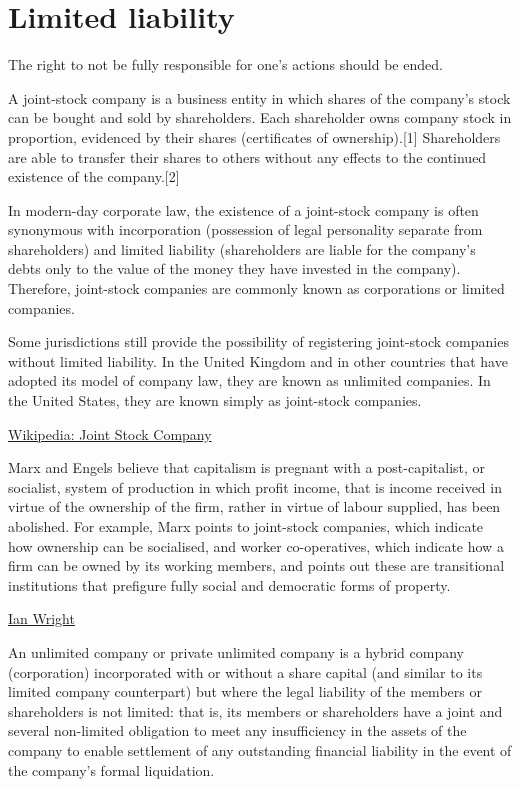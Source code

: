 \documentclass[
]{book}
\begin{document}
\hypertarget{limited-liability}{%
\section{Limited liability}\label{limited-liability}}

The right to not be fully responsible for one's actions should be ended.

A joint-stock company is a business entity in which shares of the company's stock can be bought and sold by shareholders. Each shareholder owns company stock in proportion, evidenced by their shares (certificates of ownership).{[}1{]} Shareholders are able to transfer their shares to others without any effects to the continued existence of the company.{[}2{]}

In modern-day corporate law, the existence of a joint-stock company is often synonymous with incorporation (possession of legal personality separate from shareholders) and limited liability (shareholders are liable for the company's debts only to the value of the money they have invested in the company). Therefore, joint-stock companies are commonly known as corporations or limited companies.

Some jurisdictions still provide the possibility of registering joint-stock companies without limited liability. In the United Kingdom and in other countries that have adopted its model of company law, they are known as unlimited companies. In the United States, they are known simply as joint-stock companies.

\href{https://en.wikipedia.org/wiki/Joint-stock_company}{Wikipedia: Joint Stock Company}

Marx and Engels believe that capitalism is pregnant with a post-capitalist, or socialist, system of production in which profit income, that is income received in virtue of the ownership of the firm, rather in virtue of labour supplied, has been abolished. For example, Marx points to joint-stock companies, which indicate how ownership can be socialised, and worker co-operatives, which indicate how a firm can be owned by its working members, and points out these are transitional institutions that prefigure fully social and democratic forms of property.

\href{https://ianwrightsite.wordpress.com/2021/03/05/marxs-irrational-irrational-commodity/}{Ian Wright}

An unlimited company or private unlimited company is a hybrid company (corporation) incorporated with or without a share capital (and similar to its limited company counterpart) but where the legal liability of the members or shareholders is not limited: that is, its members or shareholders have a joint and several non-limited obligation to meet any insufficiency in the assets of the company to enable settlement of any outstanding financial liability in the event of the company's formal liquidation.
\end{document}
